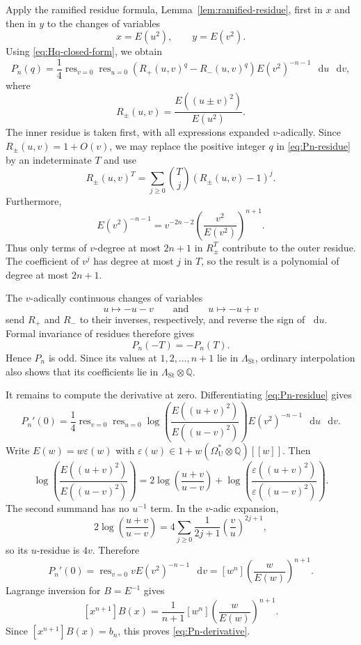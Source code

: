 \documentclass[14pt,dvipsnames]{extarticle}
\makeatletter
\numberwithin{equation}{subsection}
\theoremstyle{plain}
\theoremstyle{definition}
\theoremstyle{definition}
\renewenvironment{proof}[1][\proofname]{
 \par\pushQED{\qed}\normalfont
 \topsep6\p@\@plus6\p@\relax
 \trivlist\item[\hskip\labelsep\bfseries\itshape #1\@addpunct{.}]
}{\popQED\endtrivlist\@endpefalse}
\DeclareMathOperator*{\res}{res}
\newcommand{\dd}{\mathop{}\!\mathrm d}
\newcommand{\OmU}{\Omega_{\mathrm U}^{\ast}}
\newcommand{\LambdaSt}{\Lambda_{\mathrm{St}}}
\newcommand{\Q}{\mathbb{Q}}
\makeatother
\begin{document}
\begin{proof}
Apply the ramified residue formula, Lemma~\ref{lem:ramified-residue}, first in $x$
and then in $y$ to the changes of variables
\[
 x=E(u^2),\qquad y=E(v^2).
\]
Using \eqref{eq:Hq-closed-form}, we obtain
\begin{equation}\label{eq:Pn-residue}
 P_n(q)
 =\frac14\res_{v=0}\res_{u=0}
 \left(R_+(u,v)^q-R_-(u,v)^q\right)
 E(v^2)^{-n-1}\,\dd u\,\dd v,
\end{equation}
where
\begin{equation}\label{eq:Rpm}
 R_\pm(u,v)
 =\frac{E((u\pm v)^2)}{E(u^2)}.
\end{equation}
The inner residue is taken first, with all expressions expanded $v$-adically.
Since $R_\pm(u,v)=1+O(v)$, we may replace the positive integer $q$ in
\eqref{eq:Pn-residue} by an indeterminate $T$ and use
\[
 R_\pm(u,v)^T
 =\sum_{j\geq0}\binom{T}{j}(R_\pm(u,v)-1)^j.
\]
Furthermore,
\[
 E(v^2)^{-n-1}
 =v^{-2n-2}\left(\frac{v^2}{E(v^2)}\right)^{n+1}.
\]
Thus only terms of $v$-degree at most $2n+1$ in $R_\pm^T$ contribute to the
outer residue. The coefficient of $v^j$ has degree at most $j$ in $T$, so the
result is a polynomial of degree at most $2n+1$.

The $v$-adically continuous changes of variables
\[
 u\longmapsto-u-v
 \qquad\text{and}\qquad
 u\longmapsto-u+v
\]
send $R_+$ and $R_-$ to their inverses, respectively, and reverse the sign of
$\dd u$. Formal invariance of residues therefore gives
\[
 P_n(-T)=-P_n(T).
\]
Hence $P_n$ is odd. Since its values at $1,2,\ldots,n+1$ lie in $\LambdaSt$,
ordinary interpolation also shows that its coefficients lie in
$\LambdaSt\otimes\Q$.

It remains to compute the derivative at zero. Differentiating
\eqref{eq:Pn-residue} gives
\begin{equation}\label{eq:Pn-derivative-residue}
 P_n'(0)
 =\frac14\res_{v=0}\res_{u=0}
 \log\!\left(
  \frac{E((u+v)^2)}{E((u-v)^2)}
 \right)
 E(v^2)^{-n-1}\,\dd u\,\dd v.
\end{equation}
Write $E(w)=w\varepsilon(w)$ with $\varepsilon(w)\in1+w(\OmU\otimes\Q)[[w]]$.
Then
\[
 \log\!\left(
  \frac{E((u+v)^2)}{E((u-v)^2)}
 \right)
 =2\log\!\left(\frac{u+v}{u-v}\right)
  +\log\!\left(
    \frac{\varepsilon((u+v)^2)}{\varepsilon((u-v)^2)}
   \right).
\]
The second summand has no $u^{-1}$ term. In the $v$-adic expansion,
\[
 2\log\!\left(\frac{u+v}{u-v}\right)
 =4\sum_{j\geq0}\frac1{2j+1}\left(\frac vu\right)^{2j+1},
\]
so its $u$-residue is $4v$. Therefore
\begin{equation}\label{eq:Pn-derivative-coefficient}
 P_n'(0)
 =\res_{v=0}vE(v^2)^{-n-1}\,\dd v
 =[w^n]\left(\frac{w}{E(w)}\right)^{n+1}.
\end{equation}
Lagrange inversion for $B=E^{-1}$ gives
\[
 [x^{n+1}]B(x)
 =\frac1{n+1}[w^n]\left(\frac{w}{E(w)}\right)^{n+1}.
\]
Since $[x^{n+1}]B(x)=b_n$, this proves \eqref{eq:Pn-derivative}.
\end{proof}
\end{document}
